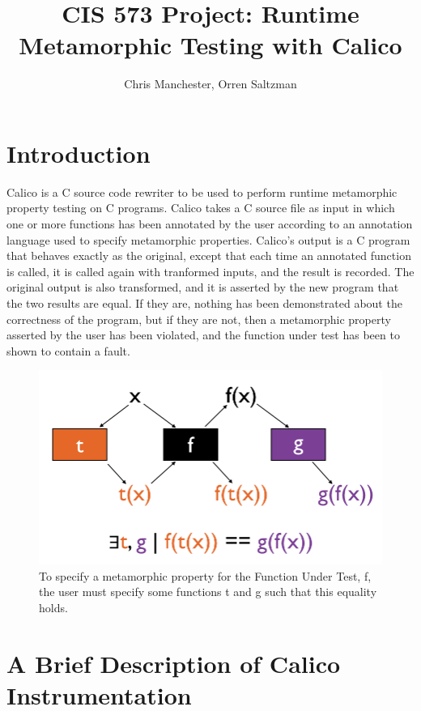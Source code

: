 \documentclass[notitlepage]{article}
\author{Chris Manchester, Orren Saltzman}
\title{CIS 573 Project: Runtime Metamorphic Testing with Calico}
\begin{document}
\maketitle

\section{Introduction}

Calico is a C source code rewriter to be used to perform runtime metamorphic property testing on C programs. Calico takes a C source file as input in which one or more functions has been annotated by the user according to an annotation language used to specify metamorphic properties. Calico's output is a C program that behaves exactly as the original, except that each time an annotated function is called, it is called again with tranformed inputs, and the result is recorded. The original output is also transformed, and it is asserted by the new program that the two results are equal. If they are, nothing has been demonstrated about the correctness of the program, but if they are not, then a metamorphic property asserted by the user has been violated, and the function under test has been to shown to contain a fault.

\begin{figure}[ht!]
\centering
\includegraphics[width=175mm]{calico_pic1_alternate.png}
\caption{To specify a metamorphic property for the Function Under Test, f, the user must specify some functions t and g such that this equality holds.}
\end{figure}

\section{A Brief Description of Calico Instrumentation}
\end{document}
